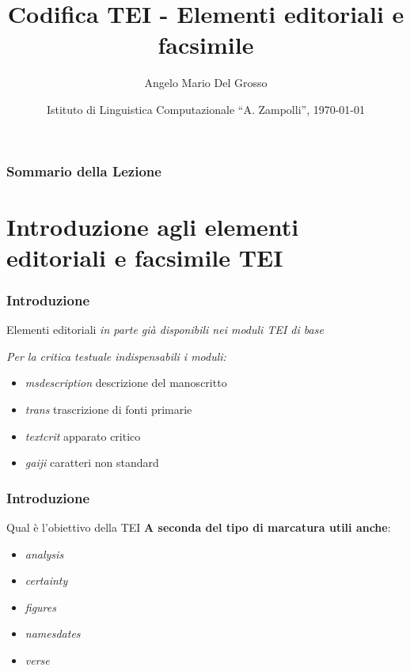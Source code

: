 \documentclass{beamer}
\title{Codifica TEI - Elementi editoriali e facsimile}
\author[A.M. Del Grosso]{Angelo Mario Del Grosso}
\institute{\texttt{angelo.delgrosso@ilc.cnr.it} \\\bigskip\textit{CNR-ILC-LicoLab} \\\bigskip\url{http://licolab.ilc.cnr.it/}}
\date{Istituto di Linguistica Computazionale ``A. Zampolli'', \today}
\begin{document}
    
    \begin{frame}
        \maketitle
    \end{frame}
    
    \begin{frame}
        \frametitle{Sommario della Lezione}
        \tableofcontents
    \end{frame}
    
    \section{Introduzione agli elementi editoriali e facsimile TEI}
    
    \begin{frame}
        \frametitle{Introduzione}
        \addtocounter{nframe}{1}
        
    
        \begin{block}{Elementi editoriali}
            \emph{in parte già disponibili nei moduli TEI di base}
            
            \textit{Per la critica testuale indispensabili i moduli:}
            \begin{itemize}
                \item \emph{msdescription} descrizione del manoscritto 
                \item \emph{trans} trascrizione di fonti primarie 
                \item \emph{textcrit} apparato critico
                \item \emph{gaiji} caratteri non standard
            \end{itemize}
        \end{block}
        
    \end{frame}
    
    \begin{frame}
        \frametitle{Introduzione}
        \addtocounter{nframe}{1}
        
        \begin{block}{Qual è l'obiettivo della TEI}
           \textbf{ A seconda del tipo di marcatura utili anche}: 
           \begin{itemize}
               \item \emph{analysis}
               \item \emph{certainty}
               \item \emph{figures}
               \item \emph{namesdates}
               \item \emph{verse}
           \end{itemize}
        \end{block}
        
    \end{frame}
    
\end{document}
